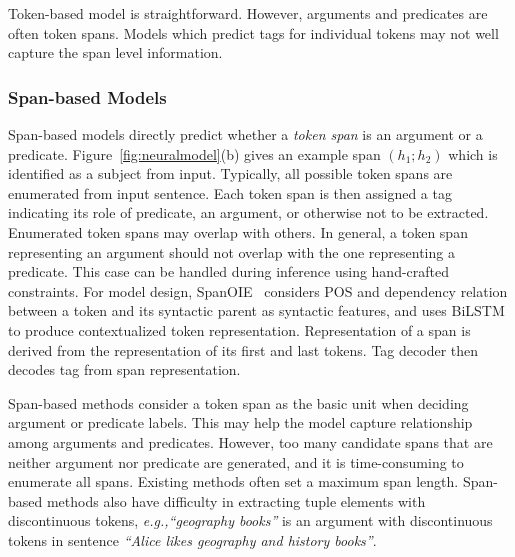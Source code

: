\documentclass{article}
\newcommand{\eg}{\emph{e.g.,}\xspace}
\begin{document}
Token-based model is straightforward. However, arguments and predicates are often token spans. Models which predict tags for individual tokens may not well capture the span level information.

\subsubsection{Span-based Models}
Span-based models directly predict whether a \textit{token span} is an argument or a predicate.
Figure~\ref{fig:neuralmodel}(b) gives an example span \((h_1;h_2)\) which is identified as a subject from input.
Typically, all possible token spans are enumerated from input sentence. Each token span is then assigned a tag indicating its role of predicate, an argument, or otherwise not to be extracted. Enumerated token spans may overlap with others. In general, a token span representing an argument should not overlap with the one representing a predicate. This case can be handled during inference using hand-crafted constraints. 
For model design, SpanOIE~\cite{zhanandzhao-2020-span} considers POS and dependency relation between a token and its syntactic parent as syntactic features, and uses BiLSTM to produce contextualized token representation. Representation of a span is derived from the representation of its first and last tokens. Tag decoder then decodes tag from span representation.

Span-based methods consider a token span as the basic unit when deciding argument or predicate labels. This may help the model capture relationship among arguments and predicates. However, too many candidate spans that are neither argument nor predicate are generated, and it is time-consuming to enumerate all spans. Existing methods often set a maximum span length. Span-based methods also have difficulty in extracting tuple elements with discontinuous tokens, \eg \textit{``geography books''} is an argument with discontinuous tokens in sentence \textit{``Alice likes geography and history books''}. 
\end{document}
